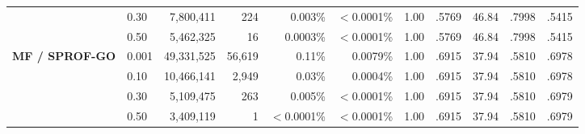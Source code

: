 \begin{table}[!h]
\begin{tabular}{ll rrrr r cccc}
 & 0.30  &  7{,}800{,}411 &       224 & 0.003\% & $<$0.0001\% & 1.00 & .5769 & 46.84 & .7998 & .5415 \\
 & 0.50  &  5{,}462{,}325 &        16 & 0.0003\% & $<$0.0001\% & 1.00 & .5769 & 46.84 & .7998 & .5415 \\
\addlinespace[2pt]
\textbf{MF / SPROF-GO}
 & 0.001 & 49{,}331{,}525 &    56{,}619 & 0.11\% & 0.0079\% & 1.00 & .6915 & 37.94 & .5810 & .6978 \\
 & 0.10  & 10{,}466{,}141 &     2{,}949 & 0.03\% & 0.0004\% & 1.00 & .6915 & 37.94 & .5810 & .6978 \\
 & 0.30  &  5{,}109{,}475 &       263 & 0.005\% & $<$0.0001\% & 1.00 & .6915 & 37.94 & .5810 & .6979 \\
 & 0.50  &  3{,}409{,}119 &         1 & $<$0.0001\% & $<$0.0001\% & 1.00 & .6915 & 37.94 & .5810 & .6979 \\
\bottomrule
\end{tabular}
\end{table}
